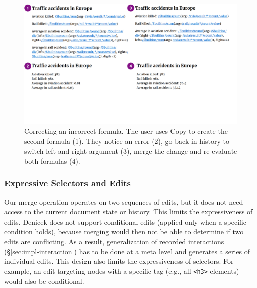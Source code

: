 \documentclass[sigconf,anonymous,screen]{acmart}
\begin{document}

\begin{figure}[t]
\includegraphics[width=1\columnwidth,clip,trim=0cm 5.5cm 1cm 0cm]{fig/copypaste.pdf}
\vspace{-1em}
\caption{Correcting an incorrect formula. The user uses Copy to create the second
formula (1). They notice an error (2), go back in history to switch left and right argument (3),
merge the change and re-evaluate both formulas (4).}
\label{fig:copypaste}
\vspace{-0.5em}
\end{figure}


\subsubsection*{Expressive Selectors and Edits}
Our merge operation operates on two sequences of edits, but it does not need access
to the current document state or history. This limits the expressiveness of edits. Denicek does not
support conditional edits (applied only when a specific condition holds), because merging would then
not be able to determine if two edits are conflicting. As a result, generalization of recorded
interactions (\S\ref{sec:impl-interaction}) has to be done at a meta level and generates a series
of individual edits. This design also limits the expressiveness of selectors. For example,
an edit targeting nodes with a specific tag (e.g., all {\small\Verb_<h3>_} elements) would also be
conditional.
\end{document}
